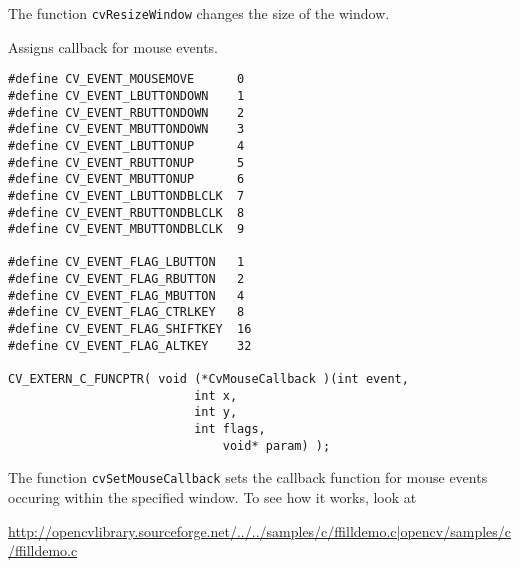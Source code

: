 The function \texttt{cvResizeWindow} changes the size of the window.

Assigns callback for mouse events.


\begin{lstlisting}
#define CV_EVENT_MOUSEMOVE      0
#define CV_EVENT_LBUTTONDOWN    1
#define CV_EVENT_RBUTTONDOWN    2
#define CV_EVENT_MBUTTONDOWN    3
#define CV_EVENT_LBUTTONUP      4
#define CV_EVENT_RBUTTONUP      5
#define CV_EVENT_MBUTTONUP      6
#define CV_EVENT_LBUTTONDBLCLK  7
#define CV_EVENT_RBUTTONDBLCLK  8
#define CV_EVENT_MBUTTONDBLCLK  9

#define CV_EVENT_FLAG_LBUTTON   1
#define CV_EVENT_FLAG_RBUTTON   2
#define CV_EVENT_FLAG_MBUTTON   4
#define CV_EVENT_FLAG_CTRLKEY   8
#define CV_EVENT_FLAG_SHIFTKEY  16
#define CV_EVENT_FLAG_ALTKEY    32

CV_EXTERN_C_FUNCPTR( void (*CvMouseCallback )(int event, 
					      int x, 
					      int y, 
					      int flags, 
				              void* param) );
\end{lstlisting}

\begin{description}
\end{description}

The function \texttt{cvSetMouseCallback} sets the callback function for mouse events occuring within the specified window. To see how it works, look at 

\url{http://opencvlibrary.sourceforge.net/../../samples/c/ffilldemo.c|opencv/samples/c/ffilldemo.c} 

